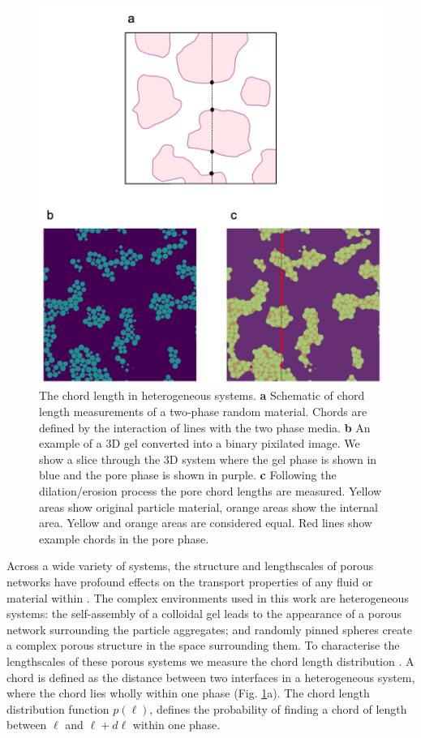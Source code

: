 \begin{figure}
	\centering
	\includegraphics[width=0.8\linewidth]{figsExpMethods/figChordLength.png}
	\caption[Determination of the chord length in heterogeneous systems]{The chord length in heterogeneous systems. \textbf{a} Schematic of chord length measurements of a two-phase random material. Chords are defined by the interaction of lines with the two phase media. \textbf{b} An example of a 3D gel converted into a binary pixilated image. We show a slice through the 3D system where the gel phase is shown in blue and the pore phase is shown in purple. \textbf{c} Following the dilation/erosion process the pore chord lengths are measured. Yellow areas show original particle material, orange areas show the internal area. Yellow and orange areas are considered equal. Red lines show example chords in the pore phase.}
	\label{fig:methods:ChordLength}
\end{figure}

 Across a wide variety of systems, the structure and lengthscales of porous networks have profound effects on the transport properties of any fluid or material within \cite{torquato1991,hofling2013}. The complex environments used in this work are heterogeneous systems: the self-assembly of a colloidal gel leads to the appearance of a porous network surrounding the particle aggregates; and randomly pinned spheres create a complex porous structure in the space surrounding them. To characterise the lengthscales of these porous systems we measure the chord length distribution \cite{torquato}. A chord is defined as the distance between two interfaces in a heterogeneous system, where the chord lies wholly within one phase (Fig. \ref{fig:methods:ChordLength}a). The chord length distribution function $p(\ell)$, defines the probability of finding a chord of length between $\ell$ and $\ell + d\ell$ within one phase. 
 
